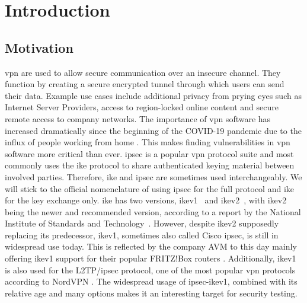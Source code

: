 \chapter{Introduction}
\label{chap:Introduction}

\section{Motivation}
\ac{vpn} are used to allow secure communication over an insecure channel. They function by creating a secure encrypted tunnel through which users can send their data. Example use cases include additional privacy from prying eyes such as Internet Server Providers, access to region-locked online content and secure remote access to company networks. The importance of \ac{vpn} software has increased dramatically since the beginning of the COVID-19 pandemic due to the influx of people working from home \cite{DBLP:journals/cacm/FeldmannGLPPDWW21}. This makes finding vulnerabilities in \ac{vpn} software more critical than ever. %
\ac{ipsec} is a popular \ac{vpn} protocol suite and most commonly uses the \ac{ike} protocol to share authenticated keying material between involved parties. Therefore, \ac{ike} and \ac{ipsec} are sometimes used interchangeably. We will stick to the official nomenclature of using \ac{ipsec} for the full protocol and \ac{ike} for the key exchange only. \ac{ike} has two versions, \ac{ike}v1~\cite{rfc:ikev1} and \ac{ike}v2~\cite{rfc:ikev2}, with \ac{ike}v2 being the newer and recommended version, according to a report by the National Institute of Standards and Technology~\cite{nist791491}. However, despite \ac{ike}v2 supposedly replacing its predecessor, \ac{ike}v1, sometimes also called Cisco \ac{ipsec}, is still in widespread use today. This is reflected by the company AVM to this day mainly offering \ac{ike}v1 support for their popular FRITZ!Box routers \cite{avm2022}. Additionally, \ac{ike}v1 is also used for the L2TP/\ac{ipsec} protocol, one of the most popular \ac{vpn} protocols according to NordVPN \cite{nordvpn2021}. The widespread usage of \ac{ipsec}-\ac{ike}v1, combined with its relative age and many options makes it an interesting target for security testing.

